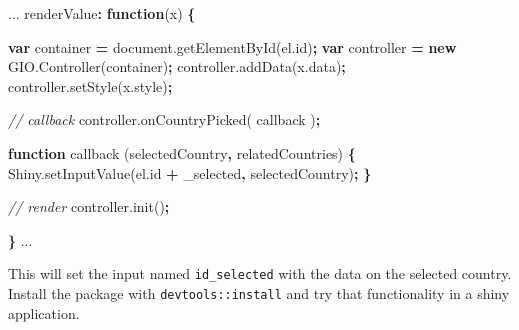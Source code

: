 \documentclass[
]{krantz}
\makeatletter
\newenvironment{Shaded}{\begin{snugshade}}{\end{snugshade}}
\newcommand{\AttributeTok}[1]{\textcolor[rgb]{0.61,0.61,0.61}{#1}}
\newcommand{\CommentTok}[1]{\textcolor[rgb]{0.37,0.37,0.37}{\textit{#1}}}
\newcommand{\KeywordTok}[1]{\textcolor[rgb]{0.27,0.27,0.27}{\textbf{#1}}}
\newcommand{\NormalTok}[1]{#1}
\newcommand{\OperatorTok}[1]{\textcolor[rgb]{0.43,0.43,0.43}{\textbf{#1}}}
\newcommand{\StringTok}[1]{\textcolor[rgb]{0.5,0.5,0.5}{#1}}
\newcommand{\VariableTok}[1]{\textcolor[rgb]{0,0,0}{#1}}
\newenvironment{kframe}{%
\medskip{}
\setlength{\fboxsep}{.8em}
 \def\at@end@of@kframe{}%
 \ifinner\ifhmode%
  \def\at@end@of@kframe{\end{minipage}}%
  \begin{minipage}{\columnwidth}%
 \fi\fi%
 \def\FrameCommand##1{\hskip\@totalleftmargin \hskip-\fboxsep
 \colorbox{shadecolor}{##1}\hskip-\fboxsep
     \hskip-\linewidth \hskip-\@totalleftmargin \hskip\columnwidth}%
 \MakeFramed {\advance\hsize-\width
   \@totalleftmargin\z@ \linewidth\hsize
   \@setminipage}}%
 {\par\unskip\endMakeFramed%
 \at@end@of@kframe}
\renewenvironment{Shaded}{\begin{kframe}}{\end{kframe}}
\makeatother
\begin{document}
\begin{Shaded}
\begin{Highlighting}[]
\NormalTok{...}
\NormalTok{renderValue}\OperatorTok{:} \KeywordTok{function}\NormalTok{(x) }\OperatorTok{\{}

  \KeywordTok{var}\NormalTok{ container }\OperatorTok{=} \VariableTok{document}\NormalTok{.}\AttributeTok{getElementById}\NormalTok{(}\VariableTok{el}\NormalTok{.}\AttributeTok{id}\NormalTok{)}\OperatorTok{;}
  \KeywordTok{var}\NormalTok{ controller }\OperatorTok{=} \KeywordTok{new} \VariableTok{GIO}\NormalTok{.}\AttributeTok{Controller}\NormalTok{(container)}\OperatorTok{;}
  \VariableTok{controller}\NormalTok{.}\AttributeTok{addData}\NormalTok{(}\VariableTok{x}\NormalTok{.}\AttributeTok{data}\NormalTok{)}\OperatorTok{;}
  \VariableTok{controller}\NormalTok{.}\AttributeTok{setStyle}\NormalTok{(}\VariableTok{x}\NormalTok{.}\AttributeTok{style}\NormalTok{)}\OperatorTok{;}

  \CommentTok{// callback}
  \VariableTok{controller}\NormalTok{.}\AttributeTok{onCountryPicked}\NormalTok{( callback )}\OperatorTok{;}

  \KeywordTok{function} \AttributeTok{callback}\NormalTok{ (selectedCountry}\OperatorTok{,}\NormalTok{ relatedCountries) }\OperatorTok{\{}
    \VariableTok{Shiny}\NormalTok{.}\AttributeTok{setInputValue}\NormalTok{(}\VariableTok{el}\NormalTok{.}\AttributeTok{id} \OperatorTok{+} \StringTok{\textquotesingle{}\_selected\textquotesingle{}}\OperatorTok{,}\NormalTok{ selectedCountry)}\OperatorTok{;}
  \OperatorTok{\}}

  \CommentTok{// render}
  \VariableTok{controller}\NormalTok{.}\AttributeTok{init}\NormalTok{()}\OperatorTok{;}

\OperatorTok{\}}
\NormalTok{...}
\end{Highlighting}
\end{Shaded}

This will set the input named \texttt{id\_selected} with the data on the selected country. Install the package with \texttt{devtools::install} and try that functionality in a shiny application.
\end{document}
